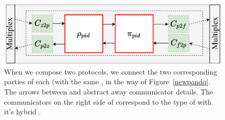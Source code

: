 \begin{figure}
\centering
\includegraphics[scale=0.5]{figures/newcompose.pdf}
\caption{When we compose two protocols, we connect the two corresponding parties of each (with the same , in the way of Figure~\ref{newpandq}. The arrows between \RHO and \PI abstract away communicator details. The communicators on the right side of \PI correspond to the type of \PI with it's hybrid \F.}
\label{fig:replacement}
\end{figure}


